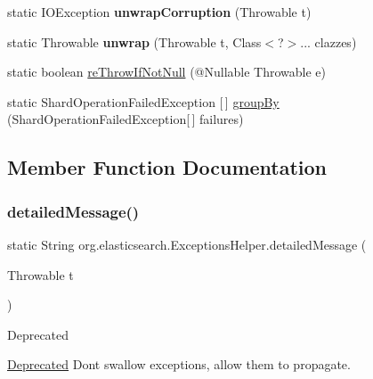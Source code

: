 \begin{DoxyCompactItemize}
\item 
\hypertarget{classorg_1_1elasticsearch_1_1_exceptions_helper_a3dc53e2153ee007acf96a8099cbb49e7}{}\label{classorg_1_1elasticsearch_1_1_exceptions_helper_a3dc53e2153ee007acf96a8099cbb49e7} 
static I\+O\+Exception {\bfseries unwrap\+Corruption} (Throwable t)
\item 
\hypertarget{classorg_1_1elasticsearch_1_1_exceptions_helper_ab5b8cc274c7a8b3583a2bc4e70fecca5}{}\label{classorg_1_1elasticsearch_1_1_exceptions_helper_ab5b8cc274c7a8b3583a2bc4e70fecca5} 
static Throwable {\bfseries unwrap} (Throwable t, Class$<$?$>$... clazzes)
\item 
static boolean \hyperlink{classorg_1_1elasticsearch_1_1_exceptions_helper_adfbdc4265cf1618e246644191df6997d}{re\+Throw\+If\+Not\+Null} (@Nullable Throwable e)
\item 
static Shard\+Operation\+Failed\+Exception \mbox{[}$\,$\mbox{]} \hyperlink{classorg_1_1elasticsearch_1_1_exceptions_helper_aa969840c5155ff78386e8361b06e9307}{group\+By} (Shard\+Operation\+Failed\+Exception\mbox{[}$\,$\mbox{]} failures)
\end{DoxyCompactItemize}


\subsection{Member Function Documentation}
\hypertarget{classorg_1_1elasticsearch_1_1_exceptions_helper_a9ceadc9e3e73578bcf5ad6f14c91e6ff}{}\label{classorg_1_1elasticsearch_1_1_exceptions_helper_a9ceadc9e3e73578bcf5ad6f14c91e6ff} 
\subsubsection{\texorpdfstring{detailed\+Message()}{detailedMessage()}}
{\footnotesize\ttfamily static String org.\+elasticsearch.\+Exceptions\+Helper.\+detailed\+Message (\begin{DoxyParamCaption}\item[{Throwable}]{t }\end{DoxyParamCaption})\hspace{0.3cm}{\ttfamily [static]}}

\begin{DoxyRefDesc}{Deprecated}
\item[\hyperlink{deprecated__deprecated000001}{Deprecated}]Don\textquotesingle{}t swallow exceptions, allow them to propagate. \end{DoxyRefDesc}
\hypertarget{classorg_1_1elasticsearch_1_1_exceptions_helper_aa969840c5155ff78386e8361b06e9307}{}\label{classorg_1_1elasticsearch_1_1_exceptions_helper_aa969840c5155ff78386e8361b06e9307} 
